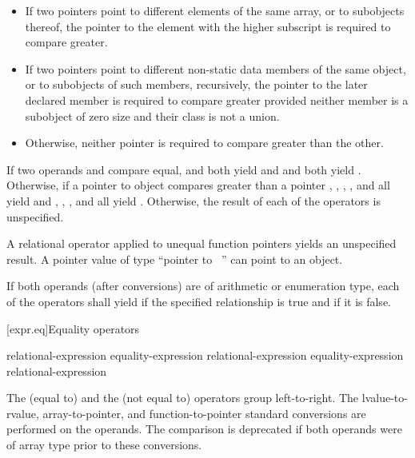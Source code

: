 \begin{itemize}
\item If two pointers point to different elements of the same array, or to
subobjects thereof, the pointer to the element with the higher subscript
is required to compare greater.

\item If two pointers point to different non-static data members of the same
object, or to subobjects of such members, recursively,
the pointer to the later declared member is required to compare greater provided
neither member is a subobject of zero size
and their class is not a union.

\item Otherwise, neither pointer is required to compare greater than the other.

\end{itemize}

\pnum
If two operands  and  compare equal,
 and  both yield  and  and
 both yield . Otherwise, if a pointer to object 
compares greater than a pointer , , ,
, and  all yield  and ,
, , and  all yield .
Otherwise, the result of each of the operators is unspecified.
\begin{note}
A relational operator applied
to unequal function pointers
yields an unspecified result.
A pointer value of type ``pointer to \cv{}~''
can point to an object.
\end{note}

\pnum
If both operands (after conversions) are of arithmetic or enumeration type, each
of the operators shall yield  if the specified relationship is true
and  if it is false.

[expr.eq]{Equality operators}%
%
%

\begin{bnf}
\br
    relational-expression\br
    equality-expression \terminal{==} relational-expression\br
    equality-expression \terminal{!=} relational-expression
\end{bnf}

\pnum
The \tcode{==} (equal to) and the \tcode{!=} (not equal to) operators
group left-to-right.
The
lvalue-to-rvalue,
array-to-pointer,
and function-to-pointer
standard conversions are performed on the operands.
The comparison is deprecated if
both operands were of array type
prior to these conversions.

